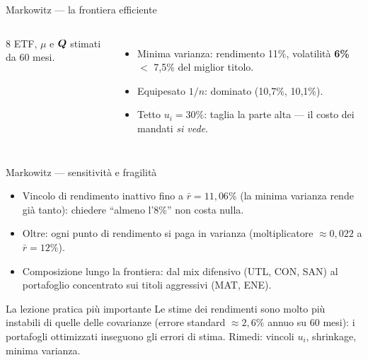 \documentclass[11pt,aspectratio=169]{beamer}
\begin{document}
\begin{frame}{Markowitz --- la frontiera efficiente}
\begin{columns}
\small
8 ETF, $\mu$ e $\boldsymbol{Q}$ \alert{stimati} da 60 mesi.
\begin{itemize}
  \item Minima varianza: rendimento 11\%, volatilità \textbf{6\%} $<$ 7,5\% del
        miglior titolo.
  \item Equipesato $1/n$: \alert{dominato} (10,7\%, 10,1\%).
  \item Tetto $u_i = 30\%$: taglia la parte alta --- il costo dei mandati
        \emph{si vede}.
\end{itemize}
\end{columns}
\end{frame}

\begin{frame}{Markowitz --- sensitività e fragilità}
\begin{itemize}
  \item Vincolo di rendimento \alert{inattivo} fino a $\bar r = 11{,}06\%$ (la
        minima varianza rende già tanto): chiedere ``almeno l'8\%'' non costa nulla.
  \item Oltre: ogni punto di rendimento si paga in varianza (moltiplicatore
        $\approx 0{,}022$ a $\bar r = 12\%$).
  \item Composizione lungo la frontiera: dal mix difensivo (UTL, CON, SAN) al
        portafoglio concentrato sui titoli aggressivi (MAT, ENE).
\end{itemize}
\begin{block}{La lezione pratica più importante}
Le stime dei rendimenti sono \alert{molto più instabili} di quelle delle covarianze
(errore standard $\approx 2{,}6\%$ annuo su 60 mesi): i portafogli ottimizzati
inseguono gli errori di stima. Rimedi: vincoli $u_i$, shrinkage, minima varianza.
\end{block}
\end{frame}
\end{document}
